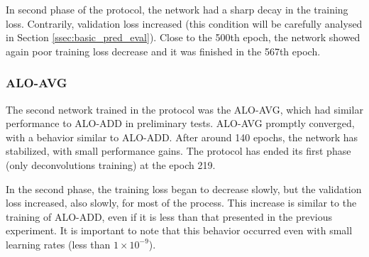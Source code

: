 
In second phase of the protocol, the network had a sharp decay in the training loss. %
Contrarily, validation loss increased (this condition will be carefully analysed in Section \ref{ssec:basic_pred_eval}).
Close to the 500th epoch, the network showed again poor training loss decrease and it was finished in the 567th epoch.

\subsubsection{ALO-AVG}
\label{ssec:bsds_subexp1_avg}

The second network trained in the protocol was the ALO-AVG, which had similar performance to ALO-ADD in preliminary tests.
ALO-AVG promptly converged, with a behavior similar to ALO-ADD.
After around 140 epochs, the network has stabilized, with small performance gains. 
The protocol has ended its first phase (only deconvolutions training) at the epoch 219.



In the second phase, the training loss began to decrease slowly, but the validation loss increased, also slowly, for most of the process.
This increase is similar to the training of ALO-ADD, even if it is less than that presented in the previous experiment.
It is important to note that this behavior occurred even with small learning rates (less than $1 \times 10^{-9}$). 

